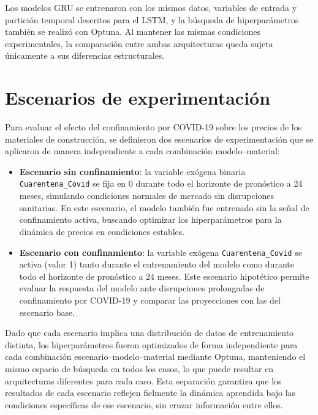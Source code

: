 \justify
Los modelos GRU se entrenaron con los mismos datos, variables de entrada y partición temporal descritos para el LSTM, y la búsqueda de hiperparámetros también se realizó con Optuna. Al mantener las mismas condiciones experimentales, la comparación entre ambas arquitecturas queda sujeta únicamente a sus diferencias estructurales.

\section{Escenarios de experimentación}
\justify
Para evaluar el efecto del confinamiento por COVID-19 sobre los precios de los materiales de construcción, se definieron dos escenarios de experimentación que se aplicaron de manera independiente a cada combinación modelo--material:

\begin{itemize}
\item \textbf{Escenario sin confinamiento}: la variable exógena binaria \texttt{Cuarentena\_Covid} se fija en 0 durante todo el horizonte de pronóstico a 24 meses, simulando condiciones normales de mercado sin disrupciones sanitarias. En este escenario, el modelo también fue entrenado sin la señal de confinamiento activa, buscando optimizar los hiperparámetros para la dinámica de precios en condiciones estables.

\item \textbf{Escenario con confinamiento}: la variable exógena \texttt{Cuarentena\_Covid} se activa (valor 1) tanto durante el entrenamiento del modelo como durante todo el horizonte de pronóstico a 24 meses. Este escenario hipotético permite evaluar la respuesta del modelo ante disrupciones prolongadas de confinamiento por COVID-19 y comparar las proyecciones con las del escenario base.
\end{itemize}

\justify
Dado que cada escenario implica una distribución de datos de entrenamiento distinta, los hiperparámetros fueron optimizados de forma independiente para cada combinación escenario--modelo--material mediante Optuna, manteniendo el mismo espacio de búsqueda en todos los casos, lo que puede resultar en arquitecturas diferentes para cada caso. Esta separación garantiza que los resultados de cada escenario reflejen fielmente la dinámica aprendida bajo las condiciones específicas de ese escenario, sin cruzar información entre ellos.

